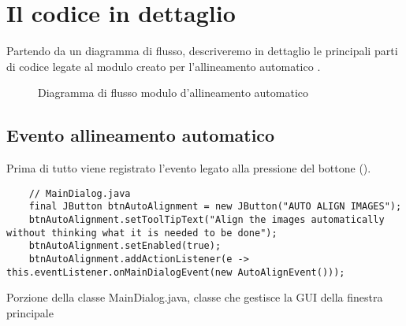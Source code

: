 \section{Il codice in dettaglio}
\noindent Partendo da un diagramma di flusso, descriveremo in dettaglio le principali parti di codice legate al modulo creato per l'allineamento automatico .

\begin{figure}[H]
\centering
{}
\caption{Diagramma di flusso modulo d'allineamento automatico}\label{fig:24}
\end{figure}


\subsection{Evento allineamento automatico}
\noindent Prima di tutto viene registrato l'evento legato alla pressione del bottone ().

\begin{listing}[H]
\begin{verbatim}
    // MainDialog.java
    final JButton btnAutoAlignment = new JButton("AUTO ALIGN IMAGES");
    btnAutoAlignment.setToolTipText("Align the images automatically without thinking what it is needed to be done");
    btnAutoAlignment.setEnabled(true);
    btnAutoAlignment.addActionListener(e -> this.eventListener.onMainDialogEvent(new AutoAlignEvent()));
\end{verbatim}
\caption{Porzione della classe MainDialog.java, classe che gestisce la GUI della finestra principale}
\label{lst:btnAutoAlignment}
\end{listing}

